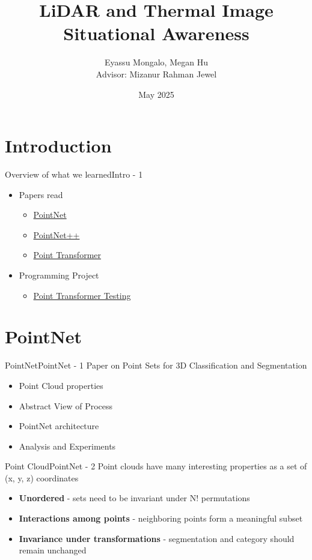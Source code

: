 \documentclass{beamer}
\title{LiDAR and Thermal Image Situational Awareness}
\author{\texorpdfstring{Eyassu Mongalo, Megan Hu \\ \small Advisor: Mizanur Rahman Jewel}
    {Eyassu Mongalo, Megan Hu, Advisor: Mizanur Rahman Jewel}}
\date{May 2025}
\begin{document}
	\maketitle
	\section{Introduction}
		\begin{frame}{Overview of what we learned}{Intro - 1}
			\begin{itemize}
				\item Papers read
				\begin{itemize}
					\item \href{https://arxiv.org/pdf/1612.00593}{PointNet}
					\item \href{https://arxiv.org/pdf/1706.02413}{PointNet++}
					\item \href{https://arxiv.org/pdf/2012.09164}{Point Transformer}
				\end{itemize}
				\item Programming Project
				\begin{itemize}
					\item \href{https://colab.research.google.com/drive/18-r47vgJSdtQkfIzKkadfpQtEpEf0Y9Q?usp=sharing}{Point Transformer Testing}
				\end{itemize}
			\end{itemize}
		\end{frame}

	\section{PointNet}
		\begin{frame}{PointNet}{PointNet - 1}
			Paper on Point Sets for 3D Classification and Segmentation
			\begin{itemize}
				\item Point Cloud properties
				\item Abstract View of Process
				\item PointNet architecture
				\item Analysis and Experiments
			\end{itemize}
		\end{frame}

		\begin{frame}{Point Cloud}{PointNet - 2}
			Point clouds have many interesting properties as a set of (x, y, z) coordinates
			\begin{itemize}
				\item \textbf{Unordered} - sets need to be invariant under N! permutations
				\item \textbf{Interactions among points} - neighboring points form a meaningful subset
				\item \textbf{Invariance under transformations} - segmentation and category should remain unchanged
			\end{itemize}
		\end{frame}
		
\end{document}
